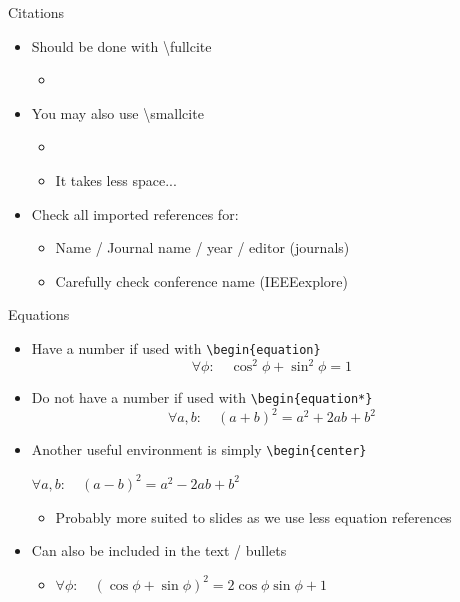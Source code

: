 \documentclass{thesisbeamer}
\begin{document}
\begin{frame}{Citations}
 \begin{itemize}[<+->]
  \item Should be done with \textbackslash{fullcite}
  \begin{itemize}[<.->]
   \item {}
  \end{itemize}\vfill
  \item You may also use \textbackslash{smallcite}
  \begin{itemize}[<.->]
   \item {}
   \item It takes less space...
  \end{itemize}\vfill
  \item Check all imported references for:
  \begin{itemize}[<.->]
   \item Name / Journal name / year / editor (journals)
   \item Carefully check conference name (IEEEexplore)
  \end{itemize}
 \end{itemize}
\end{frame}

\begin{frame}{Equations}
\begin{itemize}[<+->]
  \item Have a number if used with \texttt{\textbackslash{begin}\{equation\}}
  \begin{equation}
  \forall \phi: \quad \cos ^2 \phi + \sin^2\phi = 1
  \end{equation}\vfill
  \item Do not have a number if used with \texttt{\textbackslash{begin}\{equation*\}}
    \begin{equation*}
  \forall a, b: \quad (a+b)^2 = a^2 + 2ab + b^2
  \end{equation*}
    \item Another useful environment is simply  \texttt{\textbackslash{begin}\{center\}}
    \begin{center}
    $\forall a, b: \quad (a-b)^2 = a^2 - 2ab + b^2$
    \end{center}
    \begin{itemize}[<+->]
    \item Probably more suited to slides as we use less equation references
  \end{itemize} \vfill\vfill   
  \item Can also be included in the text / bullets
  \begin{itemize}[<+->]
    \item $\forall \phi: \quad  (\cos\phi+\sin\phi)^2 = 2\cos\phi\sin\phi + 1$
  \end{itemize}
\end{itemize}
\end{frame}
\end{document}
